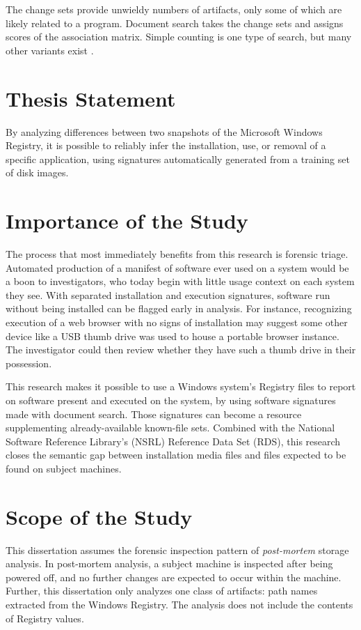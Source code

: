 \documentclass[11pt]{ucthesis}
\theoremstyle{plain}
\theoremstyle{definition}
\begin{document}
The change sets provide unwieldy numbers of artifacts, only some of which are likely related to a program.  Document search takes the change sets and assigns scores of the association matrix.  Simple counting is one type of search, but many other variants exist \cite{zobel:sigir98}.


\section{Thesis Statement}

By analyzing differences between two snapshots of the Microsoft Windows Registry, it is possible to reliably infer the installation, use, or removal of a specific application, using signatures automatically generated from a training set of disk images.


\section{Importance of the Study}

The process that most immediately benefits from this research is forensic triage.  Automated production of a manifest of software ever used on a system would be a boon to investigators, who today begin with little usage context on each system they see.  With separated installation and execution signatures, software run without being installed can be flagged early in analysis.  For instance, recognizing execution of a web browser with no signs of installation may suggest some other device like a USB thumb drive was used to house a portable browser instance.  The investigator could then review whether they have such a thumb drive in their possession.

This research makes it possible to use a Windows system's Registry files to report on software present and executed on the system, by using software signatures made with document search.  Those signatures can become a resource supplementing already-available known-file sets.  Combined with the National Software Reference Library's (NSRL) Reference Data Set (RDS), this research closes the semantic gap between installation media files and files expected to be found on subject machines.


\section{Scope of the Study}

This dissertation assumes the forensic inspection pattern of \emph{post-mortem} storage analysis.  In post-mortem analysis, a subject machine is inspected after being powered off, and no further changes are expected to occur within the machine.  Further, this dissertation only analyzes one class of artifacts: path names extracted from the Windows Registry.  The analysis does not include the contents of Registry values.
\end{document}
